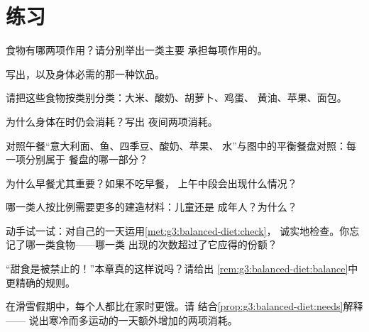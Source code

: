 \section{练习}

\begin{exercise}[$\star$]\label{exo:g3:balanced-diet:1}
食物有哪两项作用？请分别举出一类主要
承担每项作用的。
\end{exercise}

\begin{exercise}[$\star$]\label{exo:g3:balanced-diet:2}
写出，以及身体必需的那一种饮品。
\end{exercise}

\begin{exercise}[$\star$]\label{exo:g3:balanced-diet:3}
请把这些食物按类别分类：大米、酸奶、胡萝卜、鸡蛋、
黄油、苹果、面包。
\end{exercise}

\begin{exercise}[$\star$]\label{exo:g3:balanced-diet:4}
为什么身体在时仍会消耗？写出
夜间两项消耗。
\end{exercise}

\begin{exercise}[$\star$]\label{exo:g3:balanced-diet:5}
对照午餐“意大利面、鱼、四季豆、酸奶、苹果、
水”与图中的平衡餐盘对照：每一项分别属于
餐盘的哪一部分？
\end{exercise}

\begin{exercise}[$\star$]\label{exo:g3:balanced-diet:6}
为什么早餐尤其重要？如果不吃早餐，
上午中段会出现什么情况？
\end{exercise}

\begin{exercise}[$\star$]\label{exo:g3:balanced-diet:7}
哪一类人按比例需要更多的建造材料：儿童还是
成年人？为什么？
\end{exercise}

\begin{exercise}[$\star$]\label{exo:g3:balanced-diet:8}
动手试一试：对自己的一天运用\cref{met:g3:balanced-diet:check}，
诚实地检查。你忘记了哪一类食物——哪一类
出现的次数超过了它应得的份额？
\end{exercise}

\begin{exercise}[$\star\star$]\label{exo:g3:balanced-diet:9}
“甜食是被禁止的！”本章真的这样说吗？请给出
\cref{rem:g3:balanced-diet:balance}中更精确的规则。
\end{exercise}

\begin{exercise}[$\star\star$]\label{exo:g3:balanced-diet:10}
在滑雪假期中，每个人都比在家时更饿。请
结合\cref{prop:g3:balanced-diet:needs}解释——
说出寒冷而多运动的一天额外增加的两项消耗。
\end{exercise}
